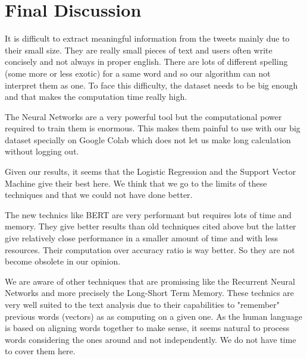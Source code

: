 \documentclass[11pt, a4paper, twocolumn]{article}
\begin{document}
\section{Final Discussion}
It is difficult to extract meaningful information 
from the tweets mainly due to their small size. They are really small pieces of text and users often write concisely and not always in proper english. There are lots of different spelling (some more or less exotic) for a same word 
and so our algorithm can not interpret them as one.
To face this difficulty, the dataset needs to be big enough and that makes the computation 
time really high.

The Neural Networks are a very powerful tool but the computational power required to train them 
is enormous. This makes them painful to use with our big dataset specially on Google Colab which does not let us make long calculation without logging out. 

Given our results, it seems that the Logistic Regression and the Support Vector Machine give their best here. We think that we go to the limits of these 
techniques and that we could not have done better. 

The new technics like BERT are very performant but requires lots of time and memory. They give better results than old techniques cited above but the latter give relatively close 
performance in a smaller amount of time and with less resources. Their computation over accuracy ratio is way better. So they are not become obsolete in our opinion.

We are aware of other techniques that are promissing like the Recurrent Neural Networks and more precisely the Long-Short Term Memory. These technics 
are very well suited to the text analysis due to their capabilities to "remember" previous words (vectors) as as computing on a given one. As the human 
language is based on aligning words together to make sense, it seems natural to process words considering the ones around and not independently. 
We do not have time to cover them here.

\clearpage
\onecolumn
\end{document}
